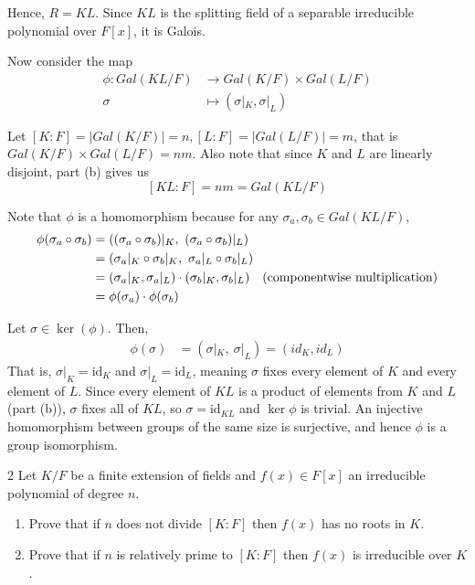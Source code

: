 \documentclass[12pt]{article}
\begin{document}
\begin{solution}
\begin{enumerate}
        Hence, $R=KL$. Since $KL$ is the splitting field of a separable irreducible polynomial over $F[x]$, it is Galois. 

        Now consider the map 
        \begin{align*}
            \phi: Gal(KL/F) &\to Gal(K/F) \times Gal(L/F) \\ 
                \sigma &\mapsto (\sigma|_K, \sigma|_L)
        \end{align*}
        
        Let $[K:F] = |Gal(K/F)| = n, [L:F] = |Gal(L/F)| = m$, that is $Gal(K/F) \times Gal(L/F) = nm$. Also note that since $K$ and $L$ are linearly disjoint, part (b) gives us \[[KL:F]  = nm = Gal(KL/F)\]

        Note that $\phi$ is a homomorphism because for any $\sigma_a, \sigma_b \in Gal(KL/F)$, 
        \begin{align*}
            \phi(\sigma_a \circ \sigma_b) &= ((\sigma_a \circ \sigma_b)|_K,\ (\sigma_a \circ \sigma_b)|_L) \\
            &= (\sigma_a|_K \circ \sigma_b|_K,\ \sigma_a|_L \circ \sigma_b|_L) \\
            &= (\sigma_a|_K, \sigma_a|_L) \cdot (\sigma_b|_K, \sigma_b|_L) \text{\quad (componentwise multiplication)}\\ 
            &= \phi(\sigma_a) \cdot \phi(\sigma_b)
        \end{align*}

        Let $\sigma \in \ker(\phi)$. Then, 
        \begin{align*}
            \phi(\sigma) &= (\sigma|_K,\ \sigma|_L)  = (id_K, id_L)
        \end{align*}
        That is, $\sigma|_K = \text{id}_K$ and $\sigma|_L = \text{id}_L$, meaning $\sigma$ fixes every element of $K$ and every element of $L$. Since every element of $KL$ is a product of elements from $K$ and $L$ (part (b)), $\sigma$ fixes all of $KL$, so $\sigma = \text{id}_{KL}$ and $\ker\phi$ is trivial.
        An injective homomorphism between groups of the same size is surjective, and hence $\phi$ is a group isomorphism.

    \end{enumerate}
\end{solution}

\newpage

\begin{problem}{2}
    Let $K/F$ be a finite extension of fields and $f(x) \in F[x]$ an irreducible polynomial of degree $n$.

    \begin{enumerate}
        \item[(a)] Prove that if $n$ does not divide $[K : F]$ then $f(x)$ has no roots in $K$.

        \item[(b)] Prove that if $n$ is relatively prime to $[K : F]$ then $f(x)$ is irreducible over $K$.
    \end{enumerate}
\end{problem}
\end{document}
